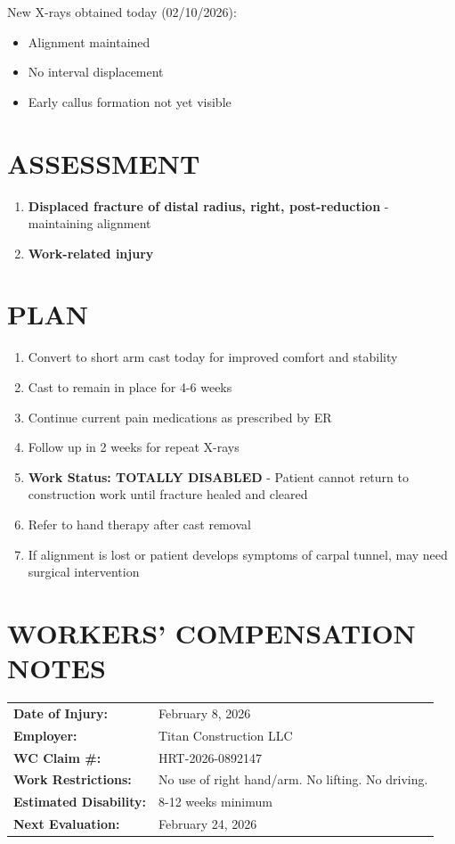\documentclass[11pt]{article}
\begin{document}
New X-rays obtained today (02/10/2026):
\begin{itemize}[nosep]
\item Alignment maintained
\item No interval displacement
\item Early callus formation not yet visible
\end{itemize}

\section*{ASSESSMENT}

\begin{enumerate}
\item \textbf{Displaced fracture of distal radius, right, post-reduction} - maintaining alignment
\item \textbf{Work-related injury}
\end{enumerate}

\section*{PLAN}

\begin{enumerate}
\item Convert to short arm cast today for improved comfort and stability
\item Cast to remain in place for 4-6 weeks
\item Continue current pain medications as prescribed by ER
\item Follow up in 2 weeks for repeat X-rays
\item \textbf{Work Status: TOTALLY DISABLED} - Patient cannot return to construction work until fracture healed and cleared
\item Refer to hand therapy after cast removal
\item If alignment is lost or patient develops symptoms of carpal tunnel, may need surgical intervention
\end{enumerate}

\section*{WORKERS' COMPENSATION NOTES}

\begin{tabular}{@{}p{5cm}p{9cm}@{}}
\textbf{Date of Injury:} & February 8, 2026 \\
\textbf{Employer:} & Titan Construction LLC \\
\textbf{WC Claim \#:} & HRT-2026-0892147 \\
\textbf{Work Restrictions:} & No use of right hand/arm. No lifting. No driving. \\
\textbf{Estimated Disability:} & 8-12 weeks minimum \\
\textbf{Next Evaluation:} & February 24, 2026 \\
\end{tabular}
\end{document}
